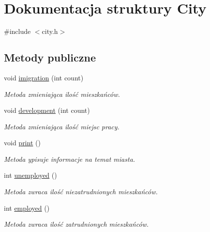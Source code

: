 \hypertarget{struct_city}{}\section{Dokumentacja struktury City}
\label{struct_city}


{\ttfamily \#include $<$city.\+h$>$}

\subsection*{Metody publiczne}
\begin{DoxyCompactItemize}
\item 
void \mbox{\hyperlink{struct_city_a23e3ed6e989bf65632be337b7cc9ff54}{imigration}} (int count)
\begin{DoxyCompactList}\small\item\em Metoda zmieniająca ilość mieszkańców. \end{DoxyCompactList}\item 
void \mbox{\hyperlink{struct_city_a939d6b83111469e8718bae03174db553}{development}} (int count)
\begin{DoxyCompactList}\small\item\em Metoda zmieniająca ilość miejsc pracy. \end{DoxyCompactList}\item 
void \mbox{\hyperlink{struct_city_ac656c752d19f2dff77197b6dd43f7900}{print}} ()
\begin{DoxyCompactList}\small\item\em Metoda ypisuje informacje na temat miasta. \end{DoxyCompactList}\item 
int \mbox{\hyperlink{struct_city_a1ea5842fbfa8225a02aea0ff4f8497fc}{unemployed}} ()
\begin{DoxyCompactList}\small\item\em Metoda zwraca ilość niezatrudnionych mieszkańców. \end{DoxyCompactList}\item 
int \mbox{\hyperlink{struct_city_af88917f06685c5c0230af013234bf3b5}{employed}} ()
\begin{DoxyCompactList}\small\item\em Metoda zwraca ilość zatrudnionych mieszkańców. \end{DoxyCompactList}\end{DoxyCompactItemize}
